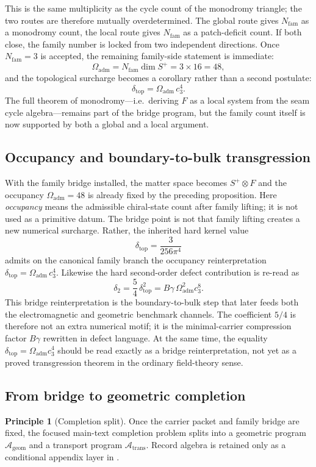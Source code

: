 \documentclass[11pt,a4paper]{article}
\theoremstyle{definition}
\newtheorem{principle}[theorem]{Principle}
\theoremstyle{remark}
\newcommand{\cthree}{c_3}
\newcommand{\deltatop}{\delta_{\mathrm{top}}}
\newcommand{\Oadm}{\Omega_{\mathrm{adm}}}
\newcommand{\Ageom}{\mathcal A_{\mathrm{geom}}}
\newcommand{\Atrans}{\mathcal A_{\mathrm{trans}}}
\begin{document}
This is the same multiplicity as the cycle count of the monodromy triangle; the two routes are therefore mutually overdetermined. The global route gives $N_{\mathrm{fam}}$ as a monodromy count, the local route gives $N_{\mathrm{fam}}$ as a patch-deficit count. If both close, the family number is locked from two independent directions. Once $N_{\mathrm{fam}}=3$ is accepted, the remaining family-side statement is immediate:
\[
\Oadm=N_{\mathrm{fam}}\dim S^+=3\times 16=48,
\]
and the topological surcharge becomes a corollary rather than a second postulate:
\[
\deltatop=\Oadm\,\cthree^4.
\]
The full theorem of monodromy---i.e.\ deriving $F$ as a local system from the seam cycle algebra---remains part of the bridge program, but the family count itself is now supported by both a global and a local argument.

\subsection{Occupancy and boundary-to-bulk transgression}

With the family bridge installed, the matter space becomes $S^+\otimes F$ and the occupancy $\Oadm=48$ is already fixed by the preceding proposition. Here \emph{occupancy} means the admissible chiral-state count after family lifting; it is not used as a primitive datum. The bridge point is not that family lifting creates a new numerical surcharge. Rather, the inherited hard kernel value
\[
\deltatop=\frac{3}{256\pi^4}
\]
admits on the canonical family branch the occupancy reinterpretation $\deltatop=\Oadm\,\cthree^4$.
Likewise the hard second-order defect contribution is re-read as
\[
\delta_2=\frac54\,\deltatop^2=B\gamma\,\Oadm^2\cthree^8.
\]
This bridge reinterpretation is the boundary-to-bulk step that later feeds both the electromagnetic and geometric benchmark channels. The coefficient $5/4$ is therefore not an extra numerical motif; it is the minimal-carrier compression factor $B\gamma$ rewritten in defect language. At the same time, the equality $\deltatop=\Oadm\cthree^4$ should be read exactly as a bridge reinterpretation, not yet as a proved transgression theorem in the ordinary field-theory sense.

\subsection{From bridge to geometric completion}

\begin{principle}[Completion split]
Once the carrier packet and family bridge are fixed, the focused main-text completion problem splits into a geometric program $\Ageom$ and a transport program $\Atrans$. Record algebra is retained only as a conditional appendix layer in .
\end{principle}
\end{document}
